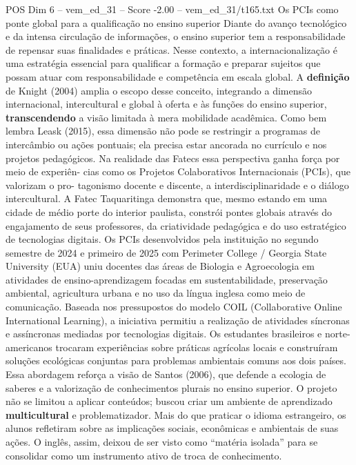 \begin{textsample}{POS Dim 6 – vem\_ed\_31 – Score -2.00 – vem\_ed\_31/t165.txt}  \label{ex:f6_pos_059}
Os PCIs como ponte global para a qualificação no ensino superior Diante do avanço tecnológico e da intensa circulação de informações, o ensino superior tem a responsabilidade de repensar suas finalidades e práticas.
Nesse contexto, a internacionalização é uma estratégia essencial para qualificar a formação e preparar sujeitos que possam atuar com responsabilidade e competência em escala global.
A \textbf{definição} de Knight (2004) amplia o escopo desse conceito, integrando a dimensão internacional, intercultural e global à oferta e às funções do ensino superior, \textbf{transcendendo} a visão limitada à mera mobilidade acadêmica.
Como bem lembra Leask (2015), essa dimensão não pode se restringir a programas de intercâmbio ou ações pontuais; ela precisa estar ancorada no currículo e nos projetos pedagógicos.
Na realidade das Fatecs essa perspectiva ganha força por meio de experiên- cias como os Projetos Colaborativos Internacionais (PCIs), que valorizam o pro- tagonismo docente e discente, a interdisciplinaridade e o diálogo intercultural.
A Fatec Taquaritinga demonstra que, mesmo estando em uma cidade de médio porte do interior paulista, constrói pontes globais através do engajamento de seus professores, da criatividade pedagógica e do uso estratégico de tecnologias digitais.
Os PCIs desenvolvidos pela instituição no segundo semestre de 2024 e primeiro de 2025 com Perimeter College / Georgia State University (EUA) uniu docentes das áreas de Biologia e Agroecologia em atividades de ensino-aprendizagem focadas em sustentabilidade, preservação ambiental, agricultura urbana e no uso da língua inglesa como meio de comunicação.
Baseada nos pressupostos do modelo COIL (Collaborative Online International Learning), a iniciativa permitiu a realização de atividades síncronas e assíncronas mediadas por tecnologias digitais.
Os estudantes brasileiros e norte-americanos trocaram experiências sobre práticas agrícolas locais e construíram soluções ecológicas conjuntas para problemas ambientais comuns aos dois países.
Essa abordagem reforça a visão de Santos (2006), que defende a ecologia de saberes e a valorização de conhecimentos plurais no ensino superior.
O projeto não se limitou a aplicar conteúdos; buscou criar um ambiente de aprendizado \textbf{multicultural} e problematizador.
Mais do que praticar o idioma estrangeiro, os alunos refletiram sobre as implicações sociais, econômicas e ambientais de suas ações.
O inglês, assim, deixou de ser visto como “matéria isolada” para se consolidar como um instrumento ativo de troca de conhecimento.

\end{textsample}
